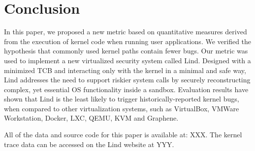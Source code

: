 \section{Conclusion}
\label{sec.conclusion}

%
In this paper, we proposed a new metric based on quantitative measures derived from
the execution of kernel code when running user applications.
We verified the hypothesis that commonly used kernel paths contain fewer bugs.
Our metric was used to implement a new virtualized security system called Lind. Designed with a minimized
TCB and interacting only with the kernel in a minimal and safe
way, Lind addresses the need to support riskier system calls by securely
reconstructing complex, yet essential OS functionality inside a sandbox.
%
Evaluation results have shown that Lind is the least likely to trigger historically-reported kernel bugs,
when compared to other virtualization systems, such as VirtualBox, VMWare Workstation, Docker, LXC, 
QEMU, KVM and Graphene.

All of the data and source code for this paper is available at: XXX.  
The kernel trace data can be accessed on the Lind website at YYY.   
